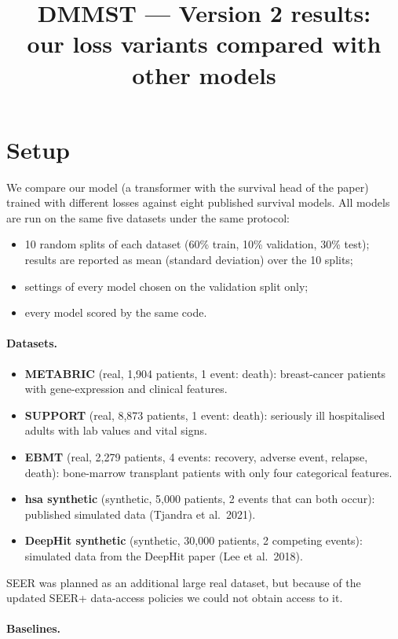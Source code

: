 \documentclass[11pt]{article}
\title{DMMST --- Version 2 results:\\our loss variants compared with other models}
\author{}
\date{}
\begin{document}
\maketitle

\section{Setup}
We compare our model (a transformer with the survival head of the paper) trained with different
losses against eight published survival models. All models are run on the same five datasets
under the same protocol:
\begin{itemize}
  \item 10 random splits of each dataset (60\% train, 10\% validation, 30\% test);
        results are reported as mean (standard deviation) over the 10 splits;
  \item settings of every model chosen on the validation split only;
  \item every model scored by the same code.
\end{itemize}

\paragraph{Datasets.}

\begin{itemize}
  \item \textbf{METABRIC} (real, 1,904 patients, 1 event: death): breast-cancer patients with gene-expression and clinical features.
  \item \textbf{SUPPORT} (real, 8,873 patients, 1 event: death): seriously ill hospitalised adults with lab values and vital signs.
  \item \textbf{EBMT} (real, 2,279 patients, 4 events: recovery, adverse event, relapse, death): bone-marrow transplant patients with only four categorical features.
  \item \textbf{hsa synthetic} (synthetic, 5,000 patients, 2 events that can both occur): published simulated data (Tjandra et al.\ 2021).
  \item \textbf{DeepHit synthetic} (synthetic, 30,000 patients, 2 competing events): simulated data from the DeepHit paper (Lee et al.\ 2018).
\end{itemize}
SEER was planned as an additional large real dataset, but because of the updated SEER+
data-access policies we could not obtain access to it.

\paragraph{Baselines.}
\end{document}
